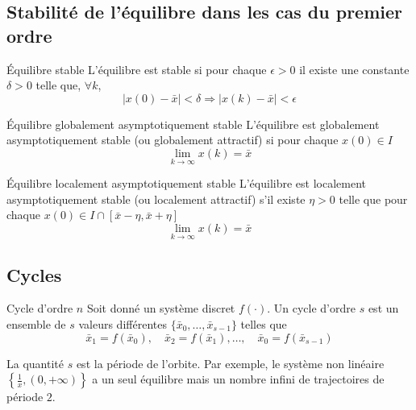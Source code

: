     \subsection{Stabilité de l'équilibre dans les cas du premier ordre}
        \begin{definition}{Équilibre stable}
            L'équilibre est stable si pour chaque $\epsilon > 0$ il existe une constante $\delta > 0$ telle que, $\forall k$,
            \begin{equation}
                |x(0) - \bar{x}| < \delta \Rightarrow |x(k) - \bar{x}| < \epsilon
            \end{equation}
        \end{definition}
        \begin{definition}{Équilibre globalement asymptotiquement stable}
            L'équilibre est globalement asymptotiquement stable (ou globalement attractif) si pour chaque $x(0) \in I$
            \begin{equation}
                \lim_{k \to \infty} x(k) = \bar{x}
            \end{equation}
        \end{definition}
        \begin{definition}{Équilibre localement asymptotiquement stable}
            L'équilibre est localement asymptotiquement stable (ou localement attractif) s'il existe $\eta > 0$ telle que pour chaque $x(0) \in I \cap [\bar{x} - \eta, \bar{x} + \eta]$ 
            \begin{equation}
                \lim_{k \to \infty} x(k) = \bar{x}
            \end{equation}
        \end{definition}

        \subsection{Cycles}
            \begin{definition}{Cycle d'ordre $n$}
                Soit donné un système discret $f(\cdot)$. Un cycle d'ordre $s$ est un ensemble de $s$ valeurs différentes $\{\bar{x}_0, \dots, \bar{x}_{s-1}\}$ telles que
                \begin{equation}
                    \bar{x}_1 = f(\bar{x}_0), \quad \bar{x}_2 = f(\bar{x}_1), \dots, \quad \bar{x}_0 = f(\bar{x}_{s-1})
                \end{equation}
            \end{definition}
            La quantité $s$ est la période de l’orbite. Par exemple, le système non linéaire $\left\{ \frac{1}{x}, (0, +\infty) \right\}$ a un seul équilibre mais un nombre infini de trajectoires de période $2$.
        
